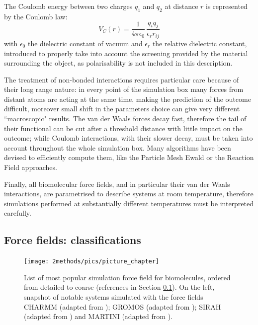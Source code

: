 The Coulomb energy between two charges $q_1$ and $q_2$ at distance $r$ is represented by the Coulomb law:
\begin{equation}
V_C(r) = \frac{1}{4 \pi \epsilon_0} \, \frac{q_i q_j}{\epsilon_r r_{ij}}
\end{equation}
with $\epsilon_0$ the dielectric constant of vacuum and $\epsilon_r$ the relative dielectric constant, introduced to properly take into account the screening provided by the material surrounding the object, as polarisability is not included in this description.

The treatment of non-bonded interactions requires particular care because of their long range nature: in every point of the simulation box many forces from distant atoms are acting at the same time, making the prediction of the outcome difficult, moreover small shift in the parameters choice can give very different ``macroscopic" results.
%
The van der Waals forces decay fast, therefore the tail of their functional can be cut after a threshold distance with little impact on the outcome; while Coulomb interactions, with their slower decay, must be taken into account throughout the whole simulation box. Many algorithms have been devised to efficiently compute them, like the Particle Mesh Ewald \citep{Essmann1995} or the Reaction Field \citep{Tironi1995} approaches.

Finally, all biomolecular force fields, and in particular their van der Waals interactions, are parametrised to describe systems at room temperature, therefore simulations performed at substantially different temperatures must be interpreted carefully.


\subsection{Force fields: classifications} \label{sec:ff_ex}

\begin{figure}[p!]
\centering
\texttt{[image: 2methods/pics/picture\_chapter]}
%
\caption[MD force field classifications]{List of most popular simulation force field for biomolecules, ordered from detailed to coarse (references in Section \ref{sec:ff_ex}). On the left, snapshot of notable systems simulated with the force fields CHARMM (adapted from \citet{Lipkin2017}); GROMOS (adapted from \citet{Macpherson2019}); SIRAH (adapted from \citet{Machado2017}) and MARTINI (adapted from \citet{Samsudin2017}).}
\label{fig:ff}
\end{figure}

